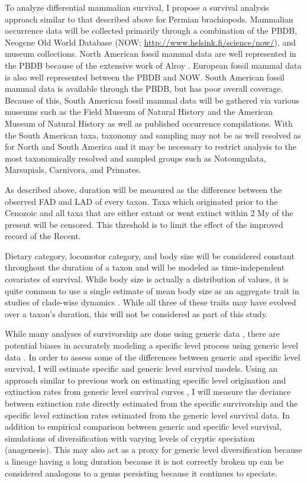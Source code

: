 \documentclass[11pt,letterpaper]{article}
\begin{document}


To analyze differential mammalian survival, I propose a survival analysis approach similar to that described above for Permian brachiopods.  Mammalian occurrence data will be collected primarily through a combination of the PBDB, Neogene Old World Database (NOW; \url{http://www.helsink.fi/science/now/}), and museum collections. North American fossil mammal data are well represented in the PBDB because of the extensive work of Alroy \citep{Alroy1996a,Alroy1998,Alroy2000g}. European fossil mammal data is also well represented between the PBDB and NOW. South American fossil mammal data is available through the PBDB, but has poor overall coverage. Because of this, South American fossil mammal data will be gathered via various museums such as the Field Museum of Natural History and the American Museum of Natural History as well as published occurrence compilations. With the South American taxa, taxonomy and sampling may not be as well resolved as for North and South America and it may be necessary to restrict analysis to the most taxonomically resolved and sampled groups such as Notoungulata, Marsupials, Carnivora, and Primates.

As described above, duration will be measured as the difference between the observed FAD and LAD of every taxon. Taxa which originated prior to the Cenozoic and all taxa that are either extant or went extinct within 2 My of the present will be censored. This threshold is to limit the effect of the improved record of the Recent.

Dietary category, locomotor category, and body size will be considered constant throughout the duration of a taxon and will be modeled as time-independent covariates of survival. While body size is actually a distribution of values, it is quite common to use a single estimate of mean body size as an aggregate trait in studies of clade-wise dynamics \citep{Jablonski2008a}. While all three of these traits may have evolved over a taxon's duration, this will not be considered as part of this study.

While many analyses of survivorship are done using generic data \citep{Tomiya2013,Liow2008,Harnik2013,Finnegan2008,Foote2006}, there are potential biases in accurately modeling a specific level process using generic level data \citep{Raup1975,Sepkoski1975,Simpson2006,Raup1991a,VanValen1979}. In order to assess some of the differences between generic and specific level survival, I will estimate specific and generic level survival models. Using an approach similar to previous work on estimating specific level origination and extinction rates from generic level survival curves \citep{Foote1988}, I will measure the deviance between extinction rate directly estimated from the specific survivorship and the specific level extinction rates estimated from the generic level survival data. In addition to empirical comparison between generic and specific level survival, simulations of diversification with varying levels of cryptic speciation (anagenesis). This may also act as a proxy for generic level diversification because a lineage having a long duration because it is not correctly broken up can be considered analogous to a genus persisting because it continues to speciate.
\end{document}
